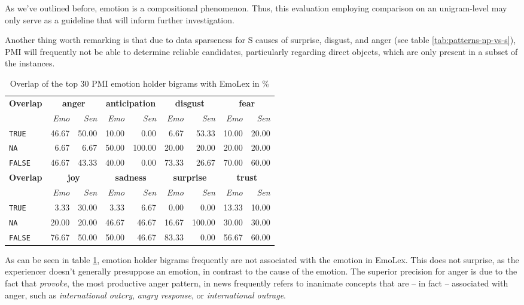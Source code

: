 As we've outlined before, emotion is a compositional phenomenon. Thus, this evaluation employing comparison on an unigram-level may only serve as a guideline that will inform further investigation.

Another thing worth remarking is that due to data sparseness for S causes of surprise, disgust, and anger (see table \ref{tab:patterns-np-vs-s}), PMI will frequently not be able to determine reliable candidates, particularly regarding direct objects, which are only present in a subset of the instances.

\begin{table}[]
\centering
\begin{tabular}{l|rr|rr|rr|rr}
{\bf Overlap} & \multicolumn{2}{c}{{\bf anger}} & \multicolumn{2}{c}{{\bf anticipation}} & \multicolumn{2}{c}{{\bf disgust}} & \multicolumn{2}{c}{{\bf fear}} \\
 & {\it Emo} & {\it Sen} & {\it Emo} & {\it Sen} & {\it Emo} & {\it Sen} & {\it Emo} & {\it Sen} \\\hline
\texttt{TRUE} & 46.67 & 50.00 & 10.00 & 0.00 & 6.67 & 53.33 & 10.00 & 20.00 \\
\texttt{NA} & 6.67 & 6.67 & 50.00 & 100.00 & 20.00 & 20.00 & 20.00 & 20.00 \\
\texttt{FALSE} & 46.67 & 43.33 & 40.00 & 0.00 & 73.33 & 26.67 & 70.00 & 60.00 \\
{\bf Overlap} & \multicolumn{2}{c}{{\bf joy}} & \multicolumn{2}{c}{{\bf sadness}} & \multicolumn{2}{c}{{\bf surprise}} & \multicolumn{2}{c}{{\bf trust}} \\
 & {\it Emo} & {\it Sen} & {\it Emo} & {\it Sen} & {\it Emo} & {\it Sen} & {\it Emo} & {\it Sen} \\\hline
\texttt{TRUE} & 3.33 & 30.00 & 3.33 & 6.67 & 0.00 & 0.00 & 13.33 & 10.00 \\
\texttt{NA} & 20.00 & 20.00 & 46.67 & 46.67 & 16.67 & 100.00 & 30.00 & 30.00 \\
\texttt{FALSE} & 76.67 & 50.00 & 50.00 & 46.67 & 83.33 & 0.00 & 56.67 & 60.00
\end{tabular}
\caption{Overlap of the top 30 PMI emotion holder bigrams with EmoLex in \%}
\label{tab:emotion-holder-nrc-overlap}
\end{table}

As can be seen in table \ref{tab:emotion-holder-nrc-overlap}, emotion holder bigrams frequently are not associated with the emotion in EmoLex. This does not surprise, as the experiencer doesn't generally presuppose an emotion, in contrast to the cause of the emotion. The superior precision for anger is due to the fact that \textit{provoke}, the most productive anger pattern, in news frequently refers to inanimate concepts that are -- in fact -- associated with anger, such as \textit{international outcry}, \textit{angry response}, or \textit{international outrage}. 

